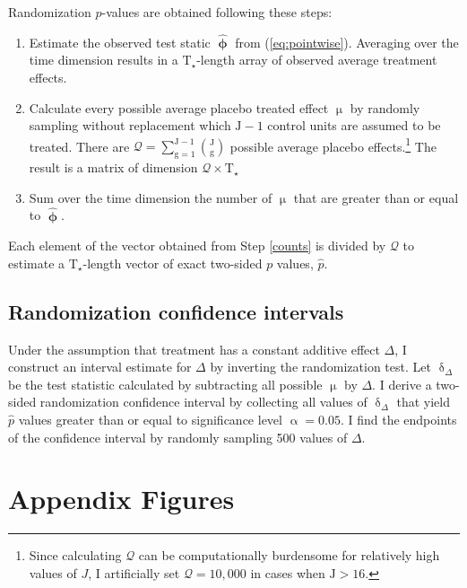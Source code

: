 \documentclass[hidelinks,12pt]{article}
\begin{document}
\begin{appendices}
Randomization $p$-values are obtained following these steps:

\begin{enumerate} 
	\item Estimate the observed test static $\boldsymbol{\hat{\upphi}}$ from (\ref{eq:pointwise}). Averaging over the time dimension results in a $\text{T}_\star$-length array of observed average treatment effects. 
	\item Calculate every possible average placebo treated effect $\upmu$ by randomly sampling without replacement which $\text{J}-1$ control units are assumed to be treated. There are $\mathcal{Q} = \sum\limits_{\text{g}=1}^{\text{J}-1} {\text{J} \choose \text{g}}$ possible average placebo effects.\footnote{Since calculating $\mathcal{Q}$ can be computationally burdensome for relatively high values of $J$, I artificially set $\mathcal{Q} = 10,000$ in cases when $\text{J} > 16$.} The result is a matrix of dimension $\mathcal{Q} \times \text{T}_\star$
	\item Sum over the time dimension the number of $\upmu$ that are greater than or equal to $\boldsymbol{\hat{\upphi}}$.  \label{counts}
\end{enumerate}

Each element of the vector obtained from Step \ref{counts} is divided by $\mathcal{Q}$ to estimate a $\text{T}_\star$-length vector of exact two-sided $p$ values, $\hat{p}$. 

\subsection{Randomization confidence intervals}

Under the assumption that treatment has a constant additive effect $\Delta$, I construct an interval estimate for $\Delta$ by inverting the randomization test. Let $\updelta_\Delta$ be the test statistic calculated by subtracting all possible $\upmu$ by $\Delta$. I derive a two-sided randomization confidence interval by collecting all values of $\updelta_\Delta$ that yield $\hat{p}$ values greater than or equal to significance level $\upalpha=0.05$. I find the endpoints of the confidence interval by randomly sampling 500 values of $\Delta$.

\clearpage
\section{Appendix Figures}


\end{appendices}
\end{document}
